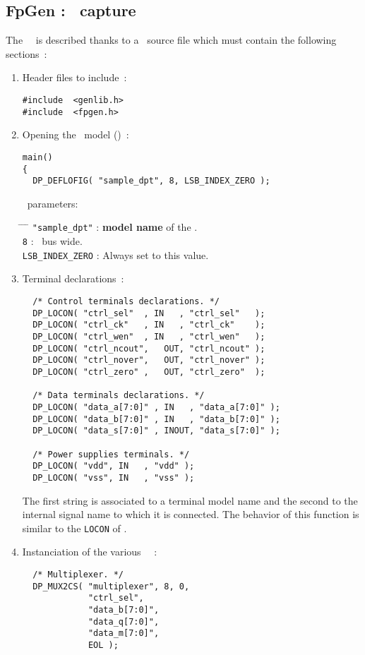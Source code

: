    \subsection{FpGen : \netlist\ capture}
       The \datapath\ \netlist\ is described thanks to a \C\ source file
     which must contain the following sections~:
     \begin{enumerate}
       \setlength{\itemsep}{0cm}
       \samepage
       \item Header files to include~:
       { \tt \begin{verbatim}
#include  <genlib.h>
#include  <fpgen.h>
       \end{verbatim} \rm }
       \pagebreak[1]
       \item Opening the \datapath\ model (\netlist)~:
       { \tt \begin{verbatim}
main()
{
  DP_DEFLOFIG( "sample_dpt", 8, LSB_INDEX_ZERO );
       \end{verbatim} \rm }
       \DPDEFLOFIG\ parameters:
       \begin{tabbing}
         \hspace{\sizeindentation} \= %
         \hspace{2.5cm}            \= %
         \hspace{0.4cm}            \= \kill
         \> {\tt "sample\_dpt"} \> : \> {\bf model name} of the \datapath.\\
         \> {\tt 8} \> : \>  \datapath\ bus wide.\\
         \> {\tt LSB\_INDEX\_ZERO} \> : \> Always set to this value.\\
       \end{tabbing}
       \pagebreak[1]
       \item Terminal declarations~:
       { \tt \begin{verbatim}
  /* Control terminals declarations. */
  DP_LOCON( "ctrl_sel"  , IN   , "ctrl_sel"   );
  DP_LOCON( "ctrl_ck"   , IN   , "ctrl_ck"    );
  DP_LOCON( "ctrl_wen"  , IN   , "ctrl_wen"   );
  DP_LOCON( "ctrl_ncout",   OUT, "ctrl_ncout" );
  DP_LOCON( "ctrl_nover",   OUT, "ctrl_nover" );
  DP_LOCON( "ctrl_zero" ,   OUT, "ctrl_zero"  );

  /* Data terminals declarations. */
  DP_LOCON( "data_a[7:0]" , IN   , "data_a[7:0]" );
  DP_LOCON( "data_b[7:0]" , IN   , "data_b[7:0]" );
  DP_LOCON( "data_s[7:0]" , INOUT, "data_s[7:0]" );

  /* Power supplies terminals. */
  DP_LOCON( "vdd", IN   , "vdd" );
  DP_LOCON( "vss", IN   , "vss" );
       \end{verbatim} \rm }
       \forceindent
         The first string is associated to a terminal model name and the
       second to the internal signal name to which it is connected. The
       behavior of this function is similar to the {\tt LOCON} of \genlib.
       \pagebreak[1]
       \item Instanciation of the various \datapath\ \operators~:
       { \tt \begin{verbatim}
  /* Multiplexer. */
  DP_MUX2CS( "multiplexer", 8, 0,
             "ctrl_sel",
             "data_b[7:0]",
             "data_q[7:0]",
             "data_m[7:0]",
             EOL );


\end{verbatim}}
\end{enumerate}

